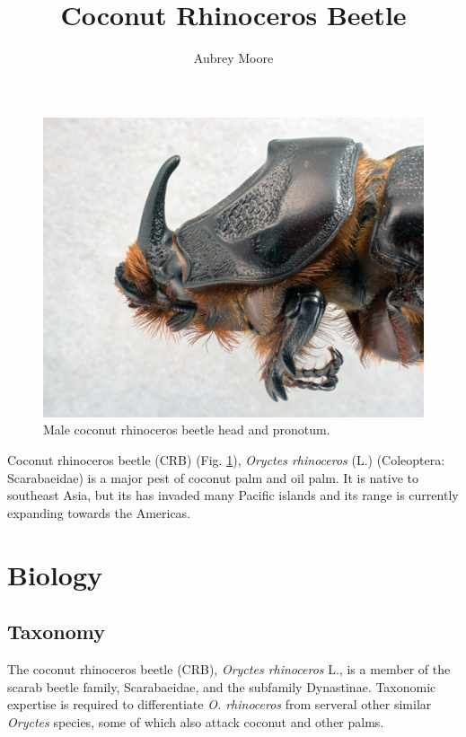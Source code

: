 \documentclass[twocolumn,letterpaper]{scrartcl}
\begin{document}
\titlehead{Forest Insect \& Disease Leaflet}	
\title{Coconut Rhinoceros Beetle}
\author{Aubrey Moore}
\maketitle


\newpage

\begin{figure}[h]
	\centering
	\includegraphics[width=\linewidth]{images/rhino_beetle_head}
	\caption{Male coconut rhinoceros beetle head and pronotum.}
	\label{fig:rhinobeetlehead}
\end{figure}

Coconut rhinoceros beetle (CRB) (Fig. \ref{fig:rhinobeetlehead}), \textit{Oryctes rhinoceros} (L.) (Coleoptera: Scarabaeidae) is a major pest of coconut palm and oil palm. It is native to southeast Asia, but its has invaded many Pacific islands and its range is currently expanding towards the Americas.

\section{Biology}

\subsection{Taxonomy}

The coconut rhinoceros beetle (CRB), \textit{Oryctes rhinoceros} L., is a member of the scarab beetle  family, Scarabaeidae, and the subfamily Dynastinae. Taxonomic expertise is required to differentiate \textit{O. rhinoceros} from serveral other similar \textit{Oryctes} species, some of which also attack coconut and other palms.
\end{document}
